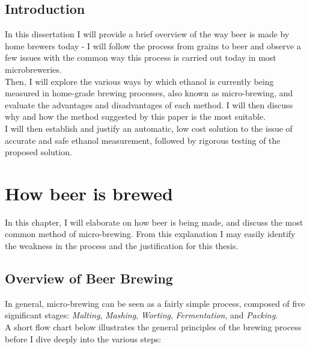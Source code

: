 \documentclass[twoside]{ctuthesis}
\theoremstyle{plain}
\theoremstyle{definition}
\theoremstyle{note}
\begin{document}
\maketitle

\section{Introduction}

In this dissertation I will provide a brief overview of the way beer is made by home brewers today - I will follow the process from grains to beer and observe a few issues with the common way this process is carried out today in most microbreweries.\\
Then, I will explore the various ways by which ethanol is currently being measured in home-grade brewing processes, also known as micro-brewing, and evaluate the advantages and disadvantages of each method. I will then discuss why and how the method suggested by this paper is the most suitable.\\
I will then establish and justify an automatic, low cost solution to the issue of accurate and safe ethanol measurement, followed by rigorous testing of the proposed solution.
\pagebreak 

\begingroup
\renewcommand{\cleardoublepage}{}
\renewcommand{\clearpage}{}
\chapter{How beer is brewed}
\endgroup

In this chapter, I will elaborate on how beer is being made, and discuss the most common method of micro-brewing.
From this explanation I may easily identify the weakness in the process and the justification for this thesis.

\section{Overview of Beer Brewing}
In general, micro-brewing can be seen as a fairly simple process, composed of five significant stages: \textit{Malting}, \textit{Mashing}, \textit{Worting}, \textit{Fermentation}, and \textit{Packing}.\\
A short flow chart below illustrates the general principles of the brewing process before I dive deeply into the various steps:
\end{document}
